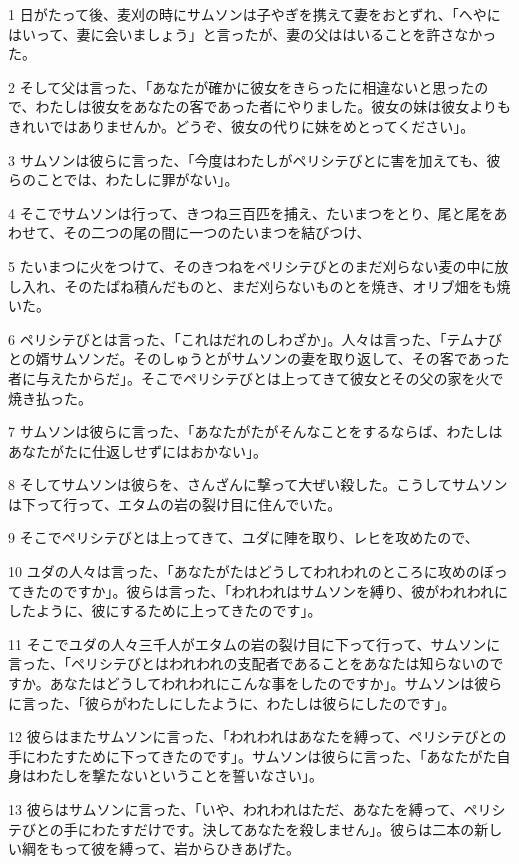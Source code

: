 \par 1 日がたって後、麦刈の時にサムソンは子やぎを携えて妻をおとずれ、「へやにはいって、妻に会いましょう」と言ったが、妻の父ははいることを許さなかった。
\par 2 そして父は言った、「あなたが確かに彼女をきらったに相違ないと思ったので、わたしは彼女をあなたの客であった者にやりました。彼女の妹は彼女よりもきれいではありませんか。どうぞ、彼女の代りに妹をめとってください」。
\par 3 サムソンは彼らに言った、「今度はわたしがペリシテびとに害を加えても、彼らのことでは、わたしに罪がない」。
\par 4 そこでサムソンは行って、きつね三百匹を捕え、たいまつをとり、尾と尾をあわせて、その二つの尾の間に一つのたいまつを結びつけ、
\par 5 たいまつに火をつけて、そのきつねをペリシテびとのまだ刈らない麦の中に放し入れ、そのたばね積んだものと、まだ刈らないものとを焼き、オリブ畑をも焼いた。
\par 6 ペリシテびとは言った、「これはだれのしわざか」。人々は言った、「テムナびとの婿サムソンだ。そのしゅうとがサムソンの妻を取り返して、その客であった者に与えたからだ」。そこでペリシテびとは上ってきて彼女とその父の家を火で焼き払った。
\par 7 サムソンは彼らに言った、「あなたがたがそんなことをするならば、わたしはあなたがたに仕返しせずにはおかない」。
\par 8 そしてサムソンは彼らを、さんざんに撃って大ぜい殺した。こうしてサムソンは下って行って、エタムの岩の裂け目に住んでいた。
\par 9 そこでペリシテびとは上ってきて、ユダに陣を取り、レヒを攻めたので、
\par 10 ユダの人々は言った、「あなたがたはどうしてわれわれのところに攻めのぼってきたのですか」。彼らは言った、「われわれはサムソンを縛り、彼がわれわれにしたように、彼にするために上ってきたのです」。
\par 11 そこでユダの人々三千人がエタムの岩の裂け目に下って行って、サムソンに言った、「ペリシテびとはわれわれの支配者であることをあなたは知らないのですか。あなたはどうしてわれわれにこんな事をしたのですか」。サムソンは彼らに言った、「彼らがわたしにしたように、わたしは彼らにしたのです」。
\par 12 彼らはまたサムソンに言った、「われわれはあなたを縛って、ペリシテびとの手にわたすために下ってきたのです」。サムソンは彼らに言った、「あなたがた自身はわたしを撃たないということを誓いなさい」。
\par 13 彼らはサムソンに言った、「いや、われわれはただ、あなたを縛って、ペリシテびとの手にわたすだけです。決してあなたを殺しません」。彼らは二本の新しい綱をもって彼を縛って、岩からひきあげた。

